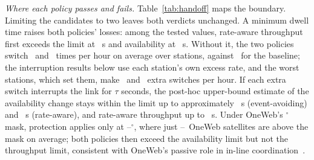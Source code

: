 \documentclass[conference]{IEEEtran}
\begin{document}
\emph{Where each policy passes and fails.} Table~\ref{tab:handoff} maps the
boundary. Limiting the candidates to two leaves both verdicts unchanged. A minimum dwell
time raises both policies' losses: among the tested values, rate-aware
throughput first exceeds the limit at \DepDwellRateMaxDegrFirstExceedS~s and
availability at \DepDwellRateMaxUnavFirstExceedS~s. Without it, the two policies
switch \DepDwellEvAvNTenSwitchesPerHour\ and \DepDwellRateMaxNTenSwitchesPerHour\
times per hour on average over stations, against \IntRateMaxBaseSwitchesPerHour\ for the
baseline; the interruption results below use each station's own excess rate, and
the worst stations, which set them, make \IntEvAvWorstExcessSwitchesPerHour\ and
\IntRateMaxWorstExcessSwitchesPerHour\ extra switches per hour. If each
extra switch interrupts the link for $\tau$ seconds, the post-hoc upper-bound estimate of the
availability change stays within the limit up to approximately
\IntEvAvMaxTauUnavS~s (event-avoiding) and \IntRateMaxMaxTauUnavS~s
(rate-aware), and rate-aware throughput up to \IntRateMaxMaxTauDegrS~s.
Under OneWeb's \OnewebMinElevSensDeg$^\circ$ mask, protection applies only at
\MinElevQualLatLo--\MinElevQualLatHi$^\circ$, where just
\MinElevNAboveMin--\MinElevNAboveMax\ OneWeb satellites are above the mask on
average; both policies then exceed the availability limit but not the throughput
limit, consistent with OneWeb's passive role in in-line
coordination~\cite[Sec.~5.1]{delportillo2019}.
\end{document}
